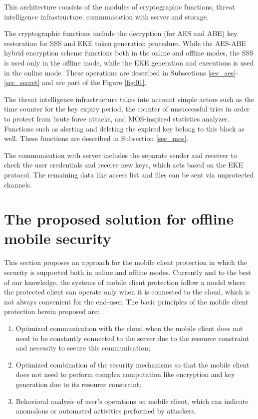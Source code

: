 \documentclass[twocolumn]{svjour3}          	%
\begin{document}
This architecture consists of the modules of cryptographic functions, threat intelligence infrastructure, communication with server and storage.

The cryptographic functions include the decryption (for AES and ABE) key restoration for SSS and EKE token generation procedure. While the AES-ABE hybrid encryption scheme functions both in the online and offline modes, the SSS is used only in the offline mode, while the EKE generation and executions is used in the online mode. These operations are described in Subsections \ref{sec_aes}-\ref{sec_secret} and are part of the Figure \ref{fig:01}.

The threat intelligence infrastructure takes into account simple actors such as the time counter for the key expiry period, the counter of unsuccessful tries in order to protect from brute force attacks, and MOS-inspired statistics analyzer. Functions such as alerting and deleting the expired key belong to this block as well. These functions are described in Subsection \ref{sec_mos}.

The communication with server includes the separate sender and receiver to check the user credentials and receive new keys, which acts based on the EKE protocol. The remaining data like access list and files can be sent via unprotected channels. 

\section{The proposed solution for offline mobile security}
\label{sec_offline_mode}
This section proposes an approach for the mobile client protection in which the security is supported both in online and offline modes. Currently and to the best of our knowledge, the systems of mobile client protection follow a model where the protected client can operate only when it is connected to the cloud, which is not always convenient for the end-user. The basic principles of the mobile client protection herein proposed are: 

\begin{enumerate}
	\item Optimized communication with the cloud when the mobile client does not need to be constantly connected to the server due to the resource constraint and necessity to secure this communication;
	\item Optimized combination of the security mechanisms so that the mobile client does not need to perform complex computation like encryption and key generation due to its resource constraint;
	\item Behavioral analysis of user's operations on mobile client, which can indicate anomalous or automated activities performed by attackers.
\end{enumerate}
\end{document}

